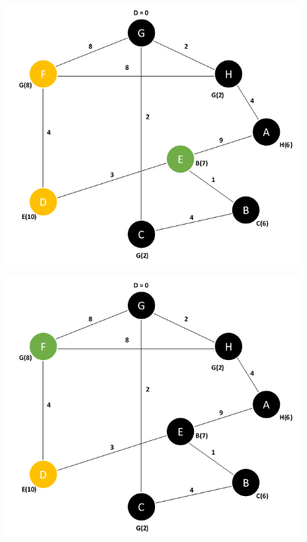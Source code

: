 \documentclass{article}
\begin{document}
\begin{figure}[H]
\centering
\includegraphics[scale=0.6]{images/Q1/06.png}
\end{figure}

\begin{figure}[H]
\centering
\includegraphics[scale=0.6]{images/Q1/07.png}
\end{figure}
\end{document}
